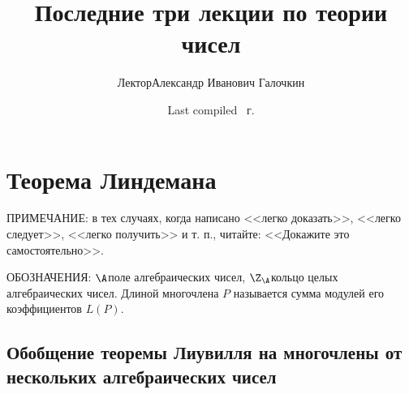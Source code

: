 \documentclass{article}
\title{Последние три лекции по теории чисел}
\author{Лектор\т Александр Иванович Галочкин}
\date{Last compiled \сегодня~г.}
\begin{document}
\maketitle

\section{Теорема Линдемана}

ПРИМЕЧАНИЕ: в тех случаях, когда написано <<легко доказать>>, <<легко следует>>,
<<легко получить>> и т. п., читайте: <<Докажите это самостоятельно>>.

ОБОЗНАЧЕНИЯ: $\A$\т поле алгебраических чисел, $\Z_\A$\т кольцо целых алгебраических чисел.
Длиной многочлена $P$ называется сумма модулей его коэффициентов $L(P)$.

\subsection{Обобщение теоремы Лиувилля на многочлены от нескольких алгебраических чисел}
\end{document}
